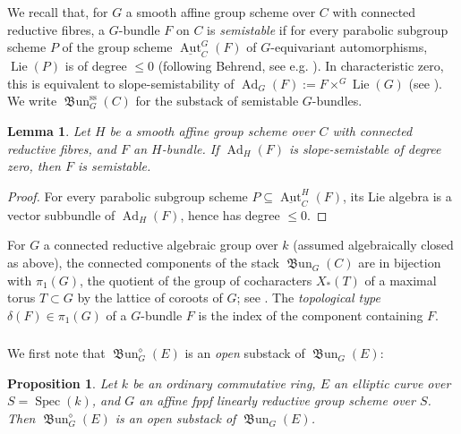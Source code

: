 \documentclass[12pt, oneside]{amsart}
\numberwithin{equation}{section}
\newtheorem{proposition}[subsubsection]{Proposition}
\newtheorem{lemma}[subsubsection]{Lemma}
\theoremstyle{remark}
\theoremstyle{plain}
\renewcommand{\le}{\leqslant}
\DeclareMathOperator{\spc}{Spec}
\renewcommand{\ss}{\mathrm{ss}}
\newcommand{\frBun}{\operatorname{\mathfrak{B}un}}
\newcommand{\uAut}{\underline{\operatorname{Aut}}}
\begin{document}
We recall that, for $G$ a smooth affine group scheme over $C$ with connected reductive fibres, a $G$-bundle $F$ on $C$ is \emph{semistable} if for every parabolic subgroup scheme $P$ of the group scheme $\uAut_C^G(F)$ of $G$-equivariant automorphisms, $\operatorname{Lie}(P)$ is of degree $\le 0$ (following Behrend, see e.g. \cite[\S 3.2]{ORT}).
In characteristic zero, this is equivalent to slope-semistability of $\operatorname{Ad}_G(F) := F \times^{G} \operatorname{Lie}(G)$ (see \cite[Lem.~3.8]{ORT}).
We write $\frBun_G^{\ss}(C)$ for the substack of semistable $G$-bundles.

\begin{lemma}\label{lem:adjoint semistability}
  Let $H$ be a smooth affine group scheme over $C$ with connected reductive fibres, and $F$ an $H$-bundle.
  If $\operatorname{Ad}_H(F)$ is slope-semistable of degree zero, then $F$ is semistable.
\end{lemma}
\begin{proof}
  For every parabolic subgroup scheme $P\subseteq\uAut_C^H(F)$, its Lie algebra is a vector subbundle of $\operatorname{Ad}_H(F)$, hence has degree $\le 0$.
\end{proof}

For $G$ a connected reductive algebraic group over $k$ (assumed algebraically closed as above), the connected components of the stack $\frBun_G(C)$ are in bijection with $\pi_1(G)$, the quotient of the group of cocharacters $X_*(T)$ of a maximal torus $T \subset G$ by the lattice of coroots of $G$; see \cite[\S\S 1.4, 2.1]{Fratila}.
The \emph{topological type} $\delta(F) \in \pi_1(G)$ of a $G$-bundle $F$ is the index of the component containing $F$.

\subsubsection{}\label{sssec:frBunGdiamond open}

We first note that $\frBun_G^{\diamond}(E)$ is an \emph{open} substack of $\frBun_G(E)$:

\begin{proposition}\label{prop:frBunGdiamond open}
  Let $k$ be an ordinary commutative ring, $E$ an elliptic curve over $S=\spc(k)$, and $G$ an affine fppf linearly reductive group scheme over $S$.
  Then $\frBun_G^\diamond(E)$ is an open substack of $\frBun_G(E)$.
\end{proposition}
\end{document}
